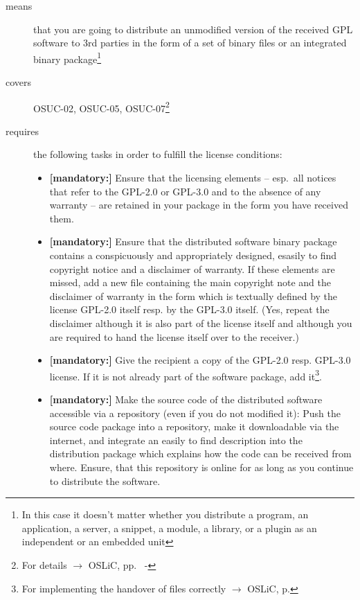 \begin{description}
\item[means] that you are going to distribute an unmodified version of the
received GPL software to 3rd parties in the form of a set of binary files or an
integrated bi\-na\-ry package\footnote{In this case it doesn't matter whether
you  distribute a program, an application, a server, a snippet, a module, a
library, or a plugin as an independent or an embedded unit}

\item[covers] OSUC-02, OSUC-05, OSUC-07\footnote{For details $\rightarrow$ OSLiC, pp.\
\pageref{OSUC-02-DEF} - \pageref{OSUC-07-DEF}}

\item[requires] the following tasks in order to fulfill the license conditions:
\begin{itemize}
  
  \item \textbf{[mandatory:]} Ensure that the licensing elements -- esp.\ all
  notices that refer to the GPL-2.0 or GPL-3.0 and to the absence of any
  warranty -- are retained in your package in the form you have received them.

  \item \textbf{[mandatory:]} Ensure that the distributed software binary
  package contains a conspicuously and appropriately designed, esasily to find
  copyright notice and a disclaimer of warranty. If these elements are missed,
  add a new file containing the main copyright note and the disclaimer of
  warranty in the form which is textually defined by the license GPL-2.0 itself
  resp. by the GPL-3.0 itself. (Yes, repeat the disclaimer although it is also
  part of the license itself and although you are required to hand the license
  itself over to the receiver.)
  
  \item \textbf{[mandatory:]} Give the recipient a copy of the GPL-2.0 resp.
  GPL-3.0 license. If it is not already part of the software package, add
  it\footnote{For implementing the handover of files correctly $\rightarrow$
  OSLiC, p. \pageref{DistributingFilesHint}}.
  
  
  
  
  \item \textbf{[mandatory:]} Make the source code of the distributed software
  accessible via a repository (even if you do not modified it): Push the source
  code package into a repository, make it downloadable via the internet, and
  integrate an easily to find description into the distribution package which
  explains how the code can be received from where. Ensure, that this
  repository is online for as long as you continue to distribute the software.
  

\end{itemize}
\end{description}
